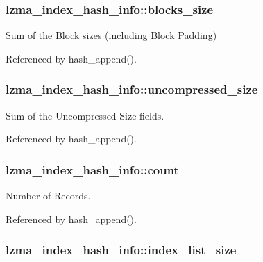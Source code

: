 \subsubsection[{blocks\-\_\-size}]{ lzma\-\_\-index\-\_\-hash\-\_\-info\-::blocks\-\_\-size}\label{structlzma__index__hash__info_ac60fec3e093c44c620dea2cd3b9a0327}


Sum of the Block sizes (including Block Padding) 



Referenced by hash\-\_\-append().

\subsubsection[{uncompressed\-\_\-size}]{ lzma\-\_\-index\-\_\-hash\-\_\-info\-::uncompressed\-\_\-size}\label{structlzma__index__hash__info_af8e5b919ce7c763da5d845a29f4f3fb3}


Sum of the Uncompressed Size fields. 



Referenced by hash\-\_\-append().

\subsubsection[{count}]{ lzma\-\_\-index\-\_\-hash\-\_\-info\-::count}\label{structlzma__index__hash__info_ad67ca290ff1a9ccd4c70e65cef0d5237}


Number of Records. 



Referenced by hash\-\_\-append().

\subsubsection[{index\-\_\-list\-\_\-size}]{ lzma\-\_\-index\-\_\-hash\-\_\-info\-::index\-\_\-list\-\_\-size}\label{structlzma__index__hash__info_a8773b43db5844301d26033342ddbc0ab}


